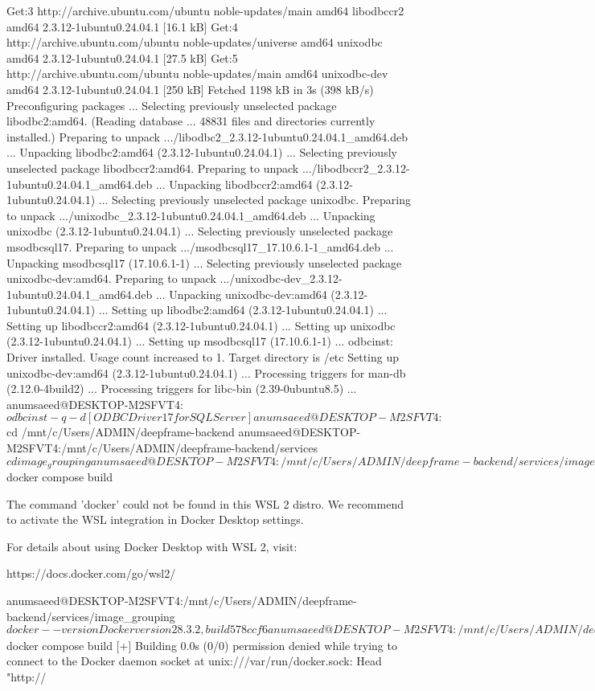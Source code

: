 Get:3 http://archive.ubuntu.com/ubuntu noble-updates/main amd64 libodbccr2 amd64 2.3.12-1ubuntu0.24.04.1 [16.1 kB]
Get:4 http://archive.ubuntu.com/ubuntu noble-updates/universe amd64 unixodbc amd64 2.3.12-1ubuntu0.24.04.1 [27.5 kB]
Get:5 http://archive.ubuntu.com/ubuntu noble-updates/main amd64 unixodbc-dev amd64 2.3.12-1ubuntu0.24.04.1 [250 kB]
Fetched 1198 kB in 3s (398 kB/s)
Preconfiguring packages ...
Selecting previously unselected package libodbc2:amd64.
(Reading database ... 48831 files and directories currently installed.)
Preparing to unpack .../libodbc2_2.3.12-1ubuntu0.24.04.1_amd64.deb ...
Unpacking libodbc2:amd64 (2.3.12-1ubuntu0.24.04.1) ...
Selecting previously unselected package libodbccr2:amd64.
Preparing to unpack .../libodbccr2_2.3.12-1ubuntu0.24.04.1_amd64.deb ...
Unpacking libodbccr2:amd64 (2.3.12-1ubuntu0.24.04.1) ...
Selecting previously unselected package unixodbc.
Preparing to unpack .../unixodbc_2.3.12-1ubuntu0.24.04.1_amd64.deb ...
Unpacking unixodbc (2.3.12-1ubuntu0.24.04.1) ...
Selecting previously unselected package msodbcsql17.
Preparing to unpack .../msodbcsql17_17.10.6.1-1_amd64.deb ...
Unpacking msodbcsql17 (17.10.6.1-1) ...
Selecting previously unselected package unixodbc-dev:amd64.
Preparing to unpack .../unixodbc-dev_2.3.12-1ubuntu0.24.04.1_amd64.deb ...
Unpacking unixodbc-dev:amd64 (2.3.12-1ubuntu0.24.04.1) ...
Setting up libodbc2:amd64 (2.3.12-1ubuntu0.24.04.1) ...
Setting up libodbccr2:amd64 (2.3.12-1ubuntu0.24.04.1) ...
Setting up unixodbc (2.3.12-1ubuntu0.24.04.1) ...
Setting up msodbcsql17 (17.10.6.1-1) ...
odbcinst: Driver installed. Usage count increased to 1.
    Target directory is /etc
Setting up unixodbc-dev:amd64 (2.3.12-1ubuntu0.24.04.1) ...
Processing triggers for man-db (2.12.0-4build2) ...
Processing triggers for libc-bin (2.39-0ubuntu8.5) ...
anumsaeed@DESKTOP-M2SFVT4:~$ odbcinst -q -d
[ODBC Driver 17 for SQL Server]
anumsaeed@DESKTOP-M2SFVT4:~$ cd /mnt/c/Users/ADMIN/deepframe-backend
anumsaeed@DESKTOP-M2SFVT4:/mnt/c/Users/ADMIN/deepframe-backend/services$ cd image_grouping
anumsaeed@DESKTOP-M2SFVT4:/mnt/c/Users/ADMIN/deepframe-backend/services/image_grouping$ docker compose build

The command 'docker' could not be found in this WSL 2 distro.
We recommend to activate the WSL integration in Docker Desktop settings.

For details about using Docker Desktop with WSL 2, visit:

https://docs.docker.com/go/wsl2/

anumsaeed@DESKTOP-M2SFVT4:/mnt/c/Users/ADMIN/deepframe-backend/services/image_grouping$ docker --version
Docker version 28.3.2, build 578ccf6
anumsaeed@DESKTOP-M2SFVT4:/mnt/c/Users/ADMIN/deepframe-backend/services/image_grouping$ docker compose build
[+] Building 0.0s (0/0)
permission denied while trying to connect to the Docker daemon socket at unix:///var/run/docker.sock: Head "http://%

